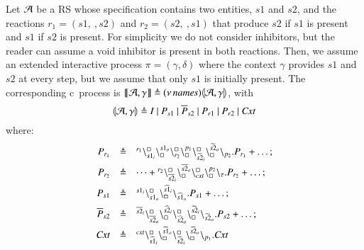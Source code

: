 \begin{example}\label{ex:backbone}
 Let ${\cal A}$ be a RS whose specification contains two entities, $s1$ and $s2$, and the reactions $r_1=(s1,\ , s2)$ and $r_2 = (s2, \ , s1)$ that produce $s2$ if $s1$ is present and $s1$ if $s2$ is present. For simplicity we do not consider inhibitors, but the reader can assume a void inhibitor is present in both reactions. Then, we assume an  extended interactive process $\pi=(\gamma,\delta)$ where the context $\gamma$ provides  $s1$ and $s2$ at every step, but we assume that only $s1$ is initially present. The corresponding c\CNA \ process is $\llbracket{\cal A},\gamma\rrbracket \triangleq (\nu\, \mathit{names}) \llparenthesis{\cal A},\gamma\rrparenthesis$, with 
$$
\llparenthesis{\cal A},\gamma\rrparenthesis \triangleq 
I ~|~ P_{s1}~|~\overline{P}_{s2}~|~ P_{r1}~|~P_{r2}~|~\mathit{Cxt}
$$
 where:
 \[
 \begin{array}{rcl}
 P_{r_1} &\triangleq& {}^{r_1}\backslash_{s1_i}^{\scriptstyle {\square}}\backslash_{\scriptstyle {\square}}^{s1_o}\backslash_{r_2}^{\scriptstyle {\square}} \backslash_{\scriptstyle {\square}}^{p_1}\backslash_{\widetilde{s2}_i}^{\scriptstyle {\square}}\backslash_{\scriptstyle {\square}}^{\widetilde{s2}_o}\backslash_{p_2}.P_{r_1} + \dots;   \\[6pt]
  P_{r_2} &\triangleq& \dots + {}^{r_2}\backslash_{\overline{s2}_i}^{\scriptstyle {\square}}\backslash_{\scriptstyle {\square}}^{\overline{s2}_o}\backslash_{\mathit{cxt}}^{\scriptstyle {\square}} \backslash_{\scriptstyle {\square}}^{p_2}\backslash_{\tau}.P_{r_2} + \dots; \\[6pt]
   P_{s1} &\triangleq& {}^{s1_i}\backslash_{s1_o}^{\scriptstyle {\square}}\backslash_{\scriptstyle {\square}}^{\widehat{s1}_i}\backslash_{\widehat{s1}_o}
 .P_{s1} + \dots; \\[6pt]
  \overline{P}_{s2} &\triangleq& {}^{\overline{s2}_i}\backslash_{\overline{s2}_o}^{\scriptstyle {\square}}
   \backslash_{\scriptstyle {\square}}^{\widehat{s2}_i}\backslash_{\widehat{s2}_o}^{\scriptstyle {\square}}\backslash_{\scriptstyle {\square}}^{\widetilde{s2}_i}\backslash_{\widetilde{s2}_o}.P_{s2} + \dots;\\[6pt]
 \mathit{Cxt}& \triangleq & {}^{\mathit{cxt}}\backslash_{\widehat{s1}_i}^{\scriptstyle {\square}}\backslash_{\scriptstyle {\square}}^{\widehat{s1}_o}
  \backslash_{\widehat{s2}_i}^{\scriptstyle {\square}}\backslash_{\scriptstyle {\square}}^{\widehat{s2}_o}\backslash_{p_1}.\mathit{Cxt}
\end{array}
\] 


\end{example}
